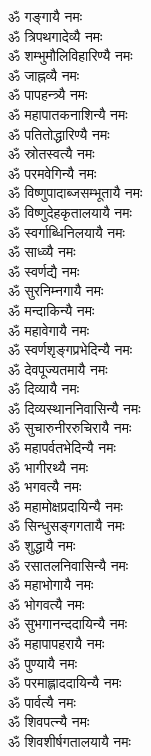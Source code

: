 \begin{multicols}{2}
\begin{flushleft}
ॐ गङ्गायै नमः\\
ॐ त्रिपथगादेव्यै नमः\\
ॐ शम्भुमौलिविहारिण्यै नमः\\
ॐ जाह्नव्यै नमः\\
ॐ पापहन्त्र्यै नमः\\
ॐ महापातकनाशिन्यै नमः\\
ॐ पतितोद्धारिण्यै नमः\\
ॐ स्रोतस्वत्यै नमः\\
ॐ परमवेगिन्यै नमः\\
ॐ विष्णुपादाब्जसम्भूतायै नमः\hfill{}\\
ॐ विष्णुदेहकृतालयायै नमः\\
ॐ स्वर्गाब्धिनिलयायै नमः\\
ॐ साध्व्यै नमः\\
ॐ स्वर्णद्यै नमः\\
ॐ सुरनिम्नगायै नमः\\
ॐ मन्दाकिन्यै नमः\\
ॐ महावेगायै नमः\\
ॐ स्वर्णशृङ्गप्रभेदिन्यै नमः\\
ॐ देवपूज्यतमायै नमः\\
ॐ दिव्यायै नमः\hfill{}\\
ॐ दिव्यस्थाननिवासिन्यै नमः\\
ॐ सुचारुनीररुचिरायै नमः\\
ॐ महापर्वतभेदिन्यै नमः\\
ॐ भागीरथ्यै नमः\\
ॐ भगवत्यै नमः\\
ॐ महामोक्षप्रदायिन्यै नमः\\
ॐ सिन्धुसङ्गगतायै नमः\\
ॐ शुद्धायै नमः\\
ॐ रसातलनिवासिन्यै नमः\\
ॐ महाभोगायै नमः\hfill{}\\
ॐ भोगवत्यै नमः\\
ॐ सुभगानन्ददायिन्यै नमः\\
ॐ महापापहरायै नमः\\
ॐ पुण्यायै नमः\\
ॐ परमाह्लाददायिन्यै नमः\\
ॐ पार्वत्यै नमः\\
ॐ शिवपत्न्यै नमः\\
ॐ शिवशीर्षगतालयायै नमः\\

\end{flushleft}
\end{multicols}
